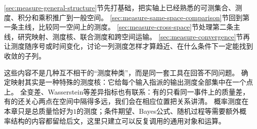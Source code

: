 \ref{sec:measure-general-structure}节先打基础，把实轴上已经熟悉的可测集合、测度、积分和乘积推广到一般空间。
\ref{sec:measure-same-space-comparison}节回到第一条主线，比较同一空间上的测度。
\ref{sec:measure-cross-space}节处理第二条主线，研究映射、测度核、联合测度和跨空间运输。
\ref{sec:measure-convergence}节再让测度随序号或时间变化，讨论一列测度怎样才算趋近、在什么条件下一定能找到收敛的子列。

这些内容不是几种互不相干的“测度种类”，而是同一套工具在回答不同问题。
确定映射其实是一种特殊的测度核：它给每个输入指派的输出测度全部集中在一个点上。
全变差、Wasserstein等差异指标也有联系：有的只看同一事件上的质量差，有的还关心两点在空间中隔得多远，我们会在相应位置把关系讲清。
概率测度在本章只是总质量恰好为$1$的测度；条件期望、Bayes公式、随机过程等需要额外概率结构的内容都留给后文，这里只建立可以反复调用的通用对象和运算。







\FloatBarrier

